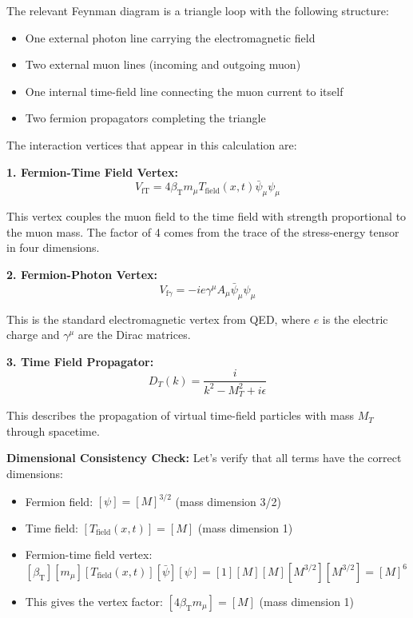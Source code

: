 \documentclass[12pt,a4paper]{article}
\newcommand{\Tfield}{T_{\text{field}}(x,t)}
\newcommand{\betaT}{\beta_{\text{T}}}
\begin{document}
	The relevant Feynman diagram is a triangle loop with the following structure:
	\begin{itemize}
		\item One external photon line carrying the electromagnetic field
		\item Two external muon lines (incoming and outgoing muon)
		\item One internal time-field line connecting the muon current to itself
		\item Two fermion propagators completing the triangle
	\end{itemize}
	
	The interaction vertices that appear in this calculation are:
	
	\textbf{1. Fermion-Time Field Vertex:}
	\begin{equation}
		V_{\text{fT}} = 4\betaT m_\mu \Tfield \bar{\psi}_\mu \psi_\mu
	\end{equation}
	
	This vertex couples the muon field to the time field with strength proportional to the muon mass. The factor of 4 comes from the trace of the stress-energy tensor in four dimensions.
	
	\textbf{2. Fermion-Photon Vertex:}
	\begin{equation}
		V_{\text{f}\gamma} = -ie\gamma^\mu A_\mu \bar{\psi}_\mu \psi_\mu
	\end{equation}
	
	This is the standard electromagnetic vertex from QED, where $e$ is the electric charge and $\gamma^\mu$ are the Dirac matrices.
	
	\textbf{3. Time Field Propagator:}
	\begin{equation}
		D_T(k) = \frac{i}{k^2 - M_T^2 + i\epsilon}
	\end{equation}
	
	This describes the propagation of virtual time-field particles with mass $M_T$ through spacetime.
	
	\textbf{Dimensional Consistency Check:}
	Let's verify that all terms have the correct dimensions:
	\begin{itemize}
		\item Fermion field: $[\psi] = [M]^{3/2}$ (mass dimension 3/2)
		\item Time field: $[\Tfield] = [M]$ (mass dimension 1)
		\item Fermion-time field vertex: $[\betaT][m_\mu][\Tfield][\bar{\psi}][\psi] = [1][M][M][M^{3/2}][M^{3/2}] = [M]^6$
		\item This gives the vertex factor: $[4\betaT m_\mu] = [M]$ (mass dimension 1)
	\end{itemize}
	
\end{document}
